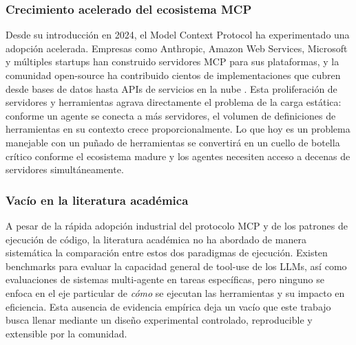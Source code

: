 \subsubsection{Crecimiento acelerado del ecosistema MCP}

Desde su introducción en 2024, el Model Context Protocol ha experimentado una
adopción acelerada. Empresas como Anthropic, Amazon Web Services, Microsoft y
múltiples startups han construido servidores MCP para sus plataformas, y la
comunidad open-source ha contribuido cientos de implementaciones que cubren
desde bases de datos hasta APIs de servicios en la nube
\citep{anthropic2024mcp}. Esta proliferación de servidores y herramientas
agrava directamente el problema de la carga estática: conforme un agente se
conecta a más servidores, el volumen de definiciones de herramientas en su
contexto crece proporcionalmente. Lo que hoy es un problema manejable con un
puñado de herramientas se convertirá en un cuello de botella crítico conforme
el ecosistema madure y los agentes necesiten acceso a decenas de servidores
simultáneamente.

\subsubsection{Vacío en la literatura académica}

A pesar de la rápida adopción industrial del protocolo MCP y de los patrones de
ejecución de código, la literatura académica no ha abordado de manera
sistemática la comparación entre estos dos paradigmas de ejecución. Existen
benchmarks para evaluar la capacidad general de tool-use de los LLMs, así como
evaluaciones de sistemas multi-agente en tareas específicas, pero ninguno se
enfoca en el eje particular de \textit{cómo} se ejecutan las herramientas y su
impacto en eficiencia. Esta ausencia de evidencia empírica deja un vacío que
este trabajo busca llenar mediante un diseño experimental controlado,
reproducible y extensible por la comunidad.
